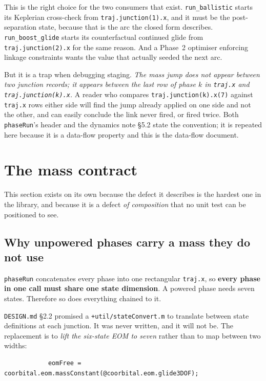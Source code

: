 \documentclass[11pt]{article}
\newcommand{\code}[1]{\texttt{#1}}
\begin{document}
This is the right choice for the two consumers that exist. \code{run\_ballistic}
starts its Keplerian cross-check from \code{traj.junction(1).x}, and it must be
the post-separation state, because that is the arc the closed form describes.
\code{run\_boost\_glide} starts its counterfactual continued glide from
\code{traj.junction(2).x} for the same reason. And a Phase~2 optimiser
enforcing linkage constraints wants the value that actually seeded the next
arc.

But it is a trap when debugging staging. \emph{The mass jump does not appear
between two junction records; it appears between the last row of phase $k$ in
\code{traj.x} and \code{traj.junction(k).x}.} A reader who compares
\code{traj.junction(k).x(7)} against \code{traj.x} rows either side will find
the jump already applied on one side and not the other, and can easily conclude
the link never fired, or fired twice. Both \code{phaseRun}'s header and the
dynamics note \S5.2 state the convention; it is repeated here because it is a
data-flow property and this is the data-flow document.

\section{The mass contract}
\label{sec:mass}

This section exists on its own because the defect it describes is the hardest
one in the library, and because it is a defect \emph{of composition} that no
unit test can be positioned to see.

\subsection{Why unpowered phases carry a mass they do not use}

\code{phaseRun} concatenates every phase into one rectangular \code{traj.x}, so
\textbf{every phase in one call must share one state dimension}. A powered
phase needs seven states. Therefore so does everything chained to it.

\code{DESIGN.md} \S2.2 promised a \code{+util/stateConvert.m} to translate
between state definitions at each junction. It was never written, and it will
not be. The replacement is to \emph{lift the six-state EOM to seven} rather
than to map between two widths:

\begin{lstlisting}
            eomFree = coorbital.eom.massConstant(@coorbital.eom.glide3DOF);
\end{lstlisting}
\end{document}
